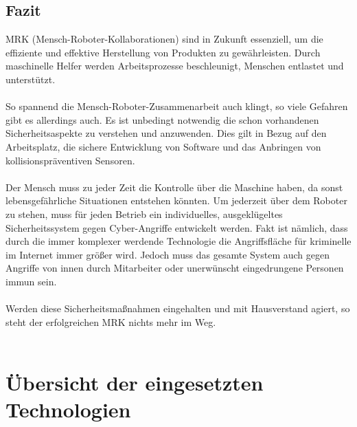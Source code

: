 \documentclass[titlepage,12pt,twoside]{article}
\begin{document}
\subsection{Fazit}
MRK (Mensch-Roboter-Kollaborationen) sind in Zukunft essenziell, um die effiziente 
und effektive Herstellung von Produkten zu gewährleisten. Durch maschinelle 
Helfer werden Arbeitsprozesse beschleunigt, Menschen entlastet und unterstützt. \\
\\
So spannend die Mensch-Roboter-Zusammenarbeit auch klingt, so viele Gefahren gibt 
es allerdings auch. Es ist unbedingt notwendig die schon vorhandenen 
Sicherheitsaspekte zu verstehen und anzuwenden. Dies gilt in Bezug auf den 
Arbeitsplatz, die sichere Entwicklung von Software und das Anbringen von 
kollisionspräventiven Sensoren. \\
\\
Der Mensch muss zu jeder Zeit die Kontrolle über die Maschine haben, da sonst 
lebensgefährliche Situationen entstehen könnten. Um jederzeit über dem Roboter 
zu stehen, muss für jeden Betrieb ein individuelles, ausgeklügeltes 
Sicherheitssystem gegen Cyber-Angriffe entwickelt werden. Fakt ist nämlich, dass 
durch die immer komplexer werdende Technologie die Angriffsfläche für kriminelle 
im Internet immer größer wird. Jedoch muss das gesamte System auch gegen Angriffe 
von innen durch Mitarbeiter oder unerwünscht eingedrungene Personen immun sein. \\
\\
Werden diese Sicherheitsmaßnahmen eingehalten und mit Hausverstand agiert, so 
steht der erfolgreichen MRK nichts mehr im Weg. \\
\\

\newpage
\section{Übersicht der eingesetzten Technologien}
\label{chap:Theoretische Grundlagen des Diplomprojekts}
\end{document}
